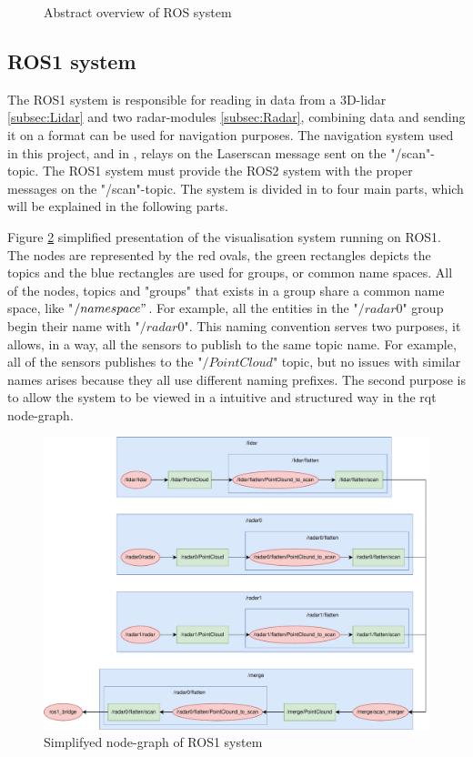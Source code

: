 \begin{figure}[H]
    \centering
    
    \caption{Abstract overview of ROS system}
    \label{fig:BlockDiagramOverwiev}
\end{figure}

\subsection{ROS1 system}
The ROS1 system is responsible for reading in data from a 3D-lidar \ref{subsec:Lidar} and two radar-modules \ref{subsec:Radar}, combining data and sending it on a format can be used for navigation purposes. The navigation system used in this project, and in \cite{uia_husky_0776}, relays on the Laserscan message sent on the "/scan"-topic. The ROS1 system must provide the ROS2 system with the proper messages on the "/scan"-topic. The system is divided in to four main parts, which will be explained in the following parts.

Figure \ref{fig:simpleRos1Rqt} simplified presentation of the visualisation system running on ROS1. The nodes are represented by the red ovals, the green rectangles depicts the topics and the blue rectangles are used for groups, or common name spaces. All of the nodes, topics and "groups" that exists in a group share a common name space, like "$/namespace"$. For example, all the entities in the "$/radar0$" group begin their name with "$/radar0$". This naming convention serves two purposes, it allows, in a way, all the sensors to publish to the same topic name. For example, all of the sensors publishes to the "$/PointCloud$" topic, but no issues with similar names arises because they all use different naming prefixes. The second purpose is to allow the system to be viewed in a intuitive and structured way in the rqt node-graph.  

\begin{figure}[H]
\centering
\includegraphics[scale=0.65]{Figures/draw.io/sipleRqtRos1.drawio.pdf}
  \caption{Simplifyed node-graph of ROS1 system}
  \label{fig:simpleRos1Rqt}
\end{figure}

